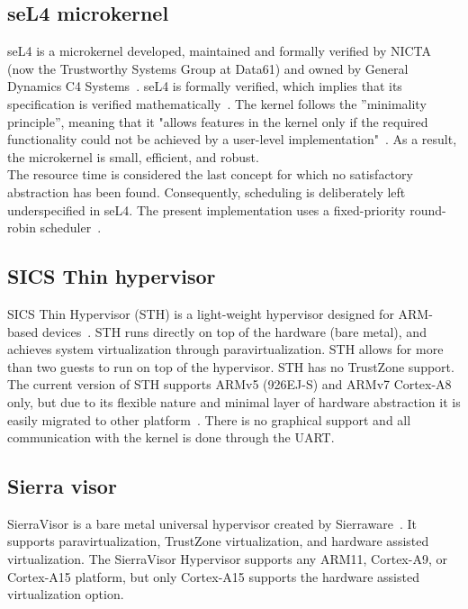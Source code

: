 \subsection{seL4 microkernel}
seL4 is a microkernel developed, maintained and formally verified by NICTA (now the Trustworthy Systems Group at Data61) and owned by General Dynamics C4 Systems~\cite{sel4}. seL4 is formally verified, which implies that its specification is verified mathematically~\cite{sel4math}. The kernel follows the ”minimality principle”, meaning that it "allows features in the kernel only if the required functionality could not be achieved by a user-level implementation"~\cite{lyons2014}. As a result, the microkernel is small, efficient, and robust.\\

The resource time is considered the last concept for which no satisfactory abstraction has been found. Consequently, scheduling is deliberately left underspecified in seL4. The present implementation uses a fixed-priority round-robin
scheduler~\cite{lyons2014}. 

\subsection{SICS Thin hypervisor}
SICS Thin Hypervisor (STH) is a light-weight hypervisor designed for ARM-based devices~\cite{STH2013}. STH runs directly on top of the hardware (bare metal), and achieves system virtualization through paravirtualization. STH allows for more than two guests to run on top of the hypervisor. STH has no TrustZone support.\\

The current version of STH supports ARMv5 (926EJ-S) and ARMv7 Cortex-A8 only, but due to its flexible nature and minimal layer of hardware abstraction it is easily migrated to other platform~\cite{STH2013}. There is no graphical support and all communication with the kernel is done through the UART.\\

\subsection{Sierra visor}
SierraVisor is a bare metal universal hypervisor created by Sierraware~\cite{sierraware}. It supports paravirtualization, TrustZone virtualization, and hardware assisted virtualization. The SierraVisor Hypervisor supports any ARM11, Cortex-A9, or Cortex-A15 platform, but only Cortex-A15 supports the hardware assisted virtualization option. 


